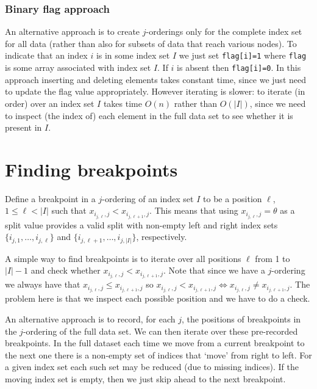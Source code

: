 \documentclass{article}
\begin{document}
\subsubsection{Binary flag approach}
\label{sec:binaryflag}

An alternative approach is to create $j$-orderings only for the
complete index set for all data (rather than also for subsets of data
that reach various nodes). To indicate that an index $i$ is in some
index set $I$ we just set \verb+flag[i]=1+ where \verb+flag+ is some
array associated with index set $I$. If $i$ is absent then
\verb+flag[i]=0+. In this approach inserting and deleting elements
takes constant time, since we just need to update the flag value
appropriately. However iterating is slower: to iterate (in order) over
an index set $I$ takes time $O(n)$ rather than $O(|I|)$, since we need
to inspect (the index of) each element in the full data set to see
whether it is present in $I$.

\section{Finding breakpoints}
\label{sec:breakpoints}

Define a breakpoint in a $j$-ordering of an index set $I$ to be a position 
$\ell$, $1 \leq \ell < |I|$ such that $x_{i_{j,\ell},j} <
x_{i_{j,\ell+1},j}$. This means that using $x_{i_{j,\ell},j} =\theta$
as a split value provides a valid split with non-empty left and right
index sets $\{i_{j,1}, \dots, i_{j,\ell}\}$ and $\{i_{j,\ell+1},
\dots, i_{j,|I|}\}$, respectively.

A simple way to find breakpoints is to iterate over all
positions $\ell$ from 1 to $|I|-1$ and check whether
$x_{i_{j,\ell},j} < x_{i_{j,\ell+1},j}$. Note that since we have a
$j$-ordering we always have that $x_{i_{j,\ell},j} \leq
x_{i_{j,\ell+1},j}$ so $x_{i_{j,\ell},j} < x_{i_{j,\ell+1},j}
\Leftrightarrow x_{i_{j,\ell},j} \neq x_{i_{j,\ell+1},j}$.
The problem here is that we inspect each possible position and we have
to do a check.


An alternative approach is to record, for each $j$, the positions of
breakpoints in the $j$-ordering of the full data set. We can then
iterate over these pre-recorded breakpoints. In the full dataset each
time we move from a current breakpoint to the next one there is a non-empty
set of indices that `move' from right to left. For a given index set
each such set may be reduced (due to missing indices). If the moving
index set is empty, then we just skip ahead to the next breakpoint.
\end{document}
